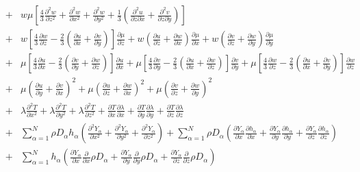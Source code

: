 \documentclass[dvips]{article}
\begin{document}
\begin{eqnarray}
& + & w\mu\left[
\frac{4}{3}\frac{\partial^{2}w}{\partial z^{2}}
          +\frac{\partial^{2}w}{\partial x^{2}}
          +\frac{\partial^{2}w}{\partial y^{2}}
+\frac{1}{3}\left(
 \frac{\partial^{2}u}{\partial z\partial x}
+\frac{\partial^{2}v}{\partial z\partial y}
            \right)
\right]\nonumber\\
& + & w\left[
\frac{4}{3}\frac{\partial w}{\partial z}
-\frac{2}{3}\left(
 \frac{\partial u}{\partial x}
+\frac{\partial v}{\partial y}
            \right)
      \right]\frac{\partial \mu}{\partial z}
+w\left(
 \frac{\partial u}{\partial z}
+\frac{\partial w}{\partial x}
 \right)\frac{\partial \mu}{\partial x}
+w\left(
 \frac{\partial v}{\partial z}
+\frac{\partial w}{\partial y}
 \right)\frac{\partial \mu}{\partial y}\nonumber\\
& + & \mu\left[
\frac{4}{3}\frac{\partial u}{\partial x}
-\frac{2}{3}\left(
 \frac{\partial v}{\partial y}
+\frac{\partial w}{\partial z}
            \right)
      \right]\frac{\partial u}{\partial x}
+ \mu\left[
\frac{4}{3}\frac{\partial v}{\partial y}
-\frac{2}{3}\left(
 \frac{\partial u}{\partial x}
+\frac{\partial w}{\partial z}
            \right)
      \right]\frac{\partial v}{\partial y}
+ \mu\left[
\frac{4}{3}\frac{\partial w}{\partial z}
-\frac{2}{3}\left(
 \frac{\partial u}{\partial x}
+\frac{\partial v}{\partial y}
            \right)
      \right]\frac{\partial w}{\partial z}\nonumber\\
& + & \mu\left(
 \frac{\partial u}{\partial y}
+\frac{\partial v}{\partial x}
 \right)^{2}
     +\mu\left(
 \frac{\partial u}{\partial z}
+\frac{\partial w}{\partial x}
 \right)^{2}
     +\mu\left(
 \frac{\partial v}{\partial z}
+\frac{\partial w}{\partial y}
 \right)^{2}\nonumber\\
& + & \lambda\frac{\partial^{2} T}{\partial x^{2}}
     +\lambda\frac{\partial^{2} T}{\partial y^{2}}
     +\lambda\frac{\partial^{2} T}{\partial z^{2}}
     +\frac{\partial T}{\partial x}\frac{\partial\lambda}{\partial x}
     +\frac{\partial T}{\partial y}\frac{\partial\lambda}{\partial y}
     +\frac{\partial T}{\partial z}\frac{\partial\lambda}{\partial z}
\nonumber\\
& + & \sum_{\alpha=1}^{N}\rho D_{\alpha}h_{\alpha}
\left(
 \frac{\partial^{2} Y_{\alpha}}{\partial x^{2}}
+\frac{\partial^{2} Y_{\alpha}}{\partial y^{2}}
+\frac{\partial^{2} Y_{\alpha}}{\partial z^{2}}
\right)
+ \sum_{\alpha=1}^{N}\rho D_{\alpha}
\left(
 \frac{\partial Y_{\alpha}}{\partial x}\frac{\partial h_{\alpha}}{\partial x}
+\frac{\partial Y_{\alpha}}{\partial y}\frac{\partial h_{\alpha}}{\partial y}
+\frac{\partial Y_{\alpha}}{\partial z}\frac{\partial h_{\alpha}}{\partial z}
\right)\nonumber\\
& + & \sum_{\alpha=1}^{N}h_{\alpha}
\left(
 \frac{\partial Y_{\alpha}}{\partial x}
 \frac{\partial}{\partial x}\rho D_{\alpha}
+\frac{\partial Y_{\alpha}}{\partial y}
 \frac{\partial}{\partial y}\rho D_{\alpha}
+\frac{\partial Y_{\alpha}}{\partial z}
 \frac{\partial}{\partial z}\rho D_{\alpha}
\right)
\label{EENERGYLE}
\end{eqnarray}
\end{document}

